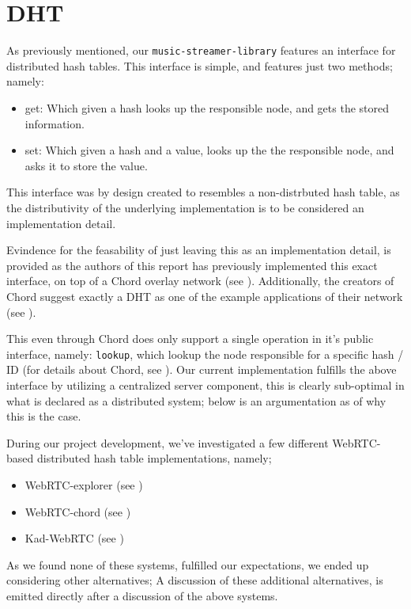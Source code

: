 \section{DHT}
\label{sec:dht}

As previously mentioned, our \verb|music-streamer-library| features an
interface for distributed hash tables. This interface is simple, and features
just two methods; namely:
\begin{itemize}
    \item get: Which given a hash looks up the responsible node, and gets the 
        stored information.
    \item set: Which given a hash and a value, looks up the the responsible
        node, and asks it to store the value.
\end{itemize}
This interface was by design created to resembles a non-distrbuted hash table,
as the distributivity of the underlying implementation is to be considered an 
implementation detail.

Evindence for the feasability of just leaving this as an implementation detail,
is provided as the authors of this report has previously implemented this exact
interface, on top of a Chord overlay network (see \citep{Skeen:Chord}).
Additionally, the creators of Chord suggest exactly a DHT as one of the example
applications of their network (see \citep{Brunskill:Chord}).

This even through Chord does only support a single operation in it's public 
interface, namely: \verb|lookup|, which lookup the node responsible for a
specific hash / ID (for details about Chord, see \citep{Stoica:Chord}).
\newline\newline
Our current implementation fulfills the above interface by utilizing a
centralized server component, this is clearly sub-optimal in what is declared
as a distributed system; below is an argumentation as of why this is the case.

During our project development, we've investigated a few different WebRTC-based
distributed hash table implementations, namely;
\begin{itemize}
    \item WebRTC-explorer (see \citep{diasdavid:webrtc-explorer})
    \item WebRTC-chord (see \citep{diasdavid:webrtc-chord})
    \item Kad-WebRTC (see \citep{kadtools:kad-webrtc})
\end{itemize}
As we found none of these systems, fulfilled our expectations, we ended up 
considering other alternatives; A discussion of these additional alternatives,
is emitted directly after a discussion of the above systems.

